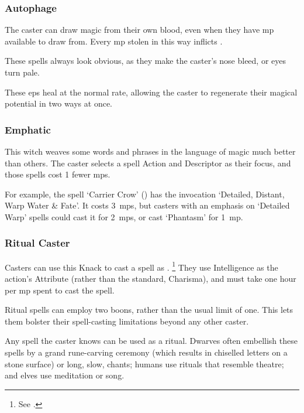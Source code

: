\begin{multicols}{2}


\subsubsection{Autophage}

The caster can draw magic from their own blood, even when they have \gls{mp} available to draw from.
Every \gls{mp} stolen in this way inflicts .

These spells always look obvious, as they make the caster's nose bleed, or eyes turn pale.

These \glspl{ep} heal at the normal rate, allowing the caster to regenerate their magical potential in two ways at once.

\subsubsection{Emphatic}
\label{emphaticCaster}

This witch weaves some words and phrases in the language of magic much better than others.
The caster selects a spell Action and Descriptor as their focus, and those spells cost 1 fewer \glspl{mp}.

For example, the spell `Carrier Crow' () has the invocation `Detailed, Distant, Warp Water \& Fate'.
It costs 3~\glspl{mp}, but casters with an emphasis on `Detailed Warp' spells could cast it for 2~\glspl{mp}, or cast `Phantasm' for 1~\gls{mp}.

\subsubsection{Ritual Caster}
\label{ritualCaster}

Casters can use this Knack to cast a spell as .%
\footnote{See .}
They use Intelligence as the action's Attribute (rather than the standard, Charisma), and must take one hour per \gls{mp} spent to cast the spell.

Ritual spells can employ two \glspl{boon}, rather than the usual limit of one.
This lets them bolster their spell-casting limitations beyond any other caster.

Any spell the caster knows can be used as a ritual.
Dwarves often embellish these spells by a grand rune-carving ceremony (which results in chiselled letters on a stone surface) or long, slow, chants; humans use rituals that resemble theatre; and elves use meditation or song.


\end{multicols}
